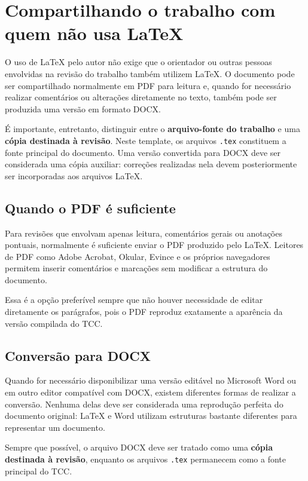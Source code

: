 \section{Compartilhando o trabalho com quem não usa LaTeX}
\label{sec:compartilhamento_docx}

O uso de LaTeX pelo autor não exige que o orientador ou outras pessoas envolvidas na revisão do trabalho também utilizem LaTeX. O documento pode ser compartilhado normalmente em PDF para leitura e, quando for necessário realizar comentários ou alterações diretamente no texto, também pode ser produzida uma versão em formato DOCX.

É importante, entretanto, distinguir entre o \textbf{arquivo-fonte do trabalho} e uma \textbf{cópia destinada à revisão}. Neste template, os arquivos \verb|.tex| constituem a fonte principal do documento. Uma versão convertida para DOCX deve ser considerada uma cópia auxiliar: correções realizadas nela devem posteriormente ser incorporadas aos arquivos LaTeX.

\subsection{Quando o PDF é suficiente}
\label{ssec:revisao_pdf}

Para revisões que envolvam apenas leitura, comentários gerais ou anotações pontuais, normalmente é suficiente enviar o PDF produzido pelo LaTeX. Leitores de PDF como Adobe Acrobat, Okular, Evince e os próprios navegadores permitem inserir comentários e marcações sem modificar a estrutura do documento.

Essa é a opção preferível sempre que não houver necessidade de editar diretamente os parágrafos, pois o PDF reproduz exatamente a aparência da versão compilada do TCC.

\subsection{Conversão para DOCX}
\label{ssec:conversao_docx}

Quando for necessário disponibilizar uma versão editável no Microsoft
Word ou em outro editor compatível com DOCX, existem diferentes formas
de realizar a conversão. Nenhuma delas deve ser considerada uma
reprodução perfeita do documento original: LaTeX e Word utilizam
estruturas bastante diferentes para representar um documento.

Sempre que possível, o arquivo DOCX deve ser tratado como uma
\textbf{cópia destinada à revisão}, enquanto os arquivos \verb|.tex|
permanecem como a fonte principal do TCC.

